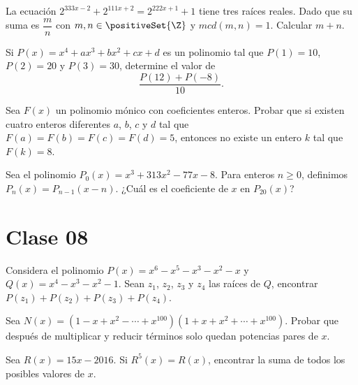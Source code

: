     \begin{problem}
        La ecuación $2^{333x - 2} + 2^{111x + 2} = 2^{222x + 1} + 1$ tiene tres raíces reales.
        Dado que su suma es $\dfrac{m}{n}$ con $m, n \in \positiveSet{\Z}$ y $mcd(m, n) = 1$.
        Calcular $m + n$.
    \end{problem}

    \begin{problem}
        Si $P(x) = x^4 + ax^3 + bx^2 + cx + d$ es un polinomio tal que $P(1) = 10$, $P(2) = 20$ y $P(3) = 30$, determine el valor de
        \[\frac{P(12) + P(-8)}{10}.\]
    \end{problem}

    \begin{problem}
        Sea $F(x)$ un polinomio mónico con coeficientes enteros.
        Probar que si existen cuatro enteros diferentes $a$, $b$, $c$ y $d$ tal que $F(a) = F(b) = F(c)  = F(d) = 5$,
        entonces no existe un entero $k$ tal que $F(k) = 8$.
    \end{problem}

    \begin{problem}
        Sea el polinomio $P_0(x) = x^3 + 313x^2 - 77x - 8$.
        Para enteros $n \geq 0$, definimos $P_n(x) = P_{n - 1}(x - n)$.
        ¿Cuál es el coeficiente de $x$ en $P_{20}(x)$?
    \end{problem}



\section{Clase 08}

\begin{problem}
    Considera el polinomio $P(x) = x^6 - x^5 - x^3 - x^2 - x$ y $Q(x) = x^4 - x^3 - x^2 - 1$.
    Sean $z_1$, $z_2$, $z_3$ y $z_4$ las raíces de $Q$, encontrar $P(z_1) + P(z_2) + P(z_3) + P(z_4)$.
\end{problem}

\begin{problem}
    Sea $N(x) = (1 - x + x^2 - \cdots + x^{100})(1 + x + x^2 + \cdots + x^{100})$.
    Probar que después de multiplicar y reducir términos solo quedan potencias pares de $x$.
\end{problem}

\begin{problem}
    Sea $R(x) = 15x - 2016$.
    Si $R^5(x) = R(x)$, encontrar la suma de todos los posibles valores de $x$.
\end{problem}

